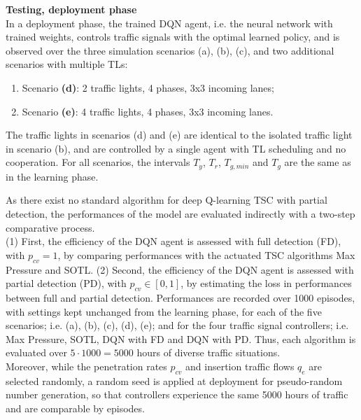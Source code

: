 \textbf{Testing, deployment phase} \\
In a deployment phase, the trained DQN agent, i.e. the neural network with trained weights, controls traffic signals with the optimal learned policy, and is observed over the three simulation scenarios (a), (b), (c), and two additional scenarios with multiple TLs:
\begin{enumerate}
\setlength\itemsep{-0.5em}
  \setcounter{enumi}{3}
  \item Scenario \textbf{(d)}: 2 traffic lights, 4 phases, 3x3 incoming lanes;
  \item Scenario \textbf{(e)}: 4 traffic lights, 4 phases, 3x3 incoming lanes.
\end{enumerate}
The traffic lights in scenarios (d) and (e) are identical to the isolated traffic light in scenario (b), and are controlled by a single agent with TL scheduling and no cooperation. For all scenarios, the intervals $T_y$, $T_r$, $T_{g,min}$ and $T_g$ are the same as in the learning phase.

\pagebreak

As there exist no standard algorithm for deep Q-learning TSC with partial detection, the performances of the model are evaluated indirectly with a two-step comparative process. \\
(1) First, the efficiency of the DQN agent is assessed with full detection (FD), with $p_{cv} = 1$, by comparing performances with the actuated TSC algorithms Max Pressure and SOTL.
(2) Second, the efficiency of the DQN agent is assessed with partial detection (PD), with $p_{cv} \in [0,1]$, by estimating the loss in performances between full and partial detection.
Performances are recorded over 1000 episodes, with settings kept unchanged from the learning phase, for each of the five scenarios; i.e. (a), (b), (c), (d), (e); and for the four traffic signal controllers; i.e. Max Pressure, SOTL, DQN with FD and DQN with PD. Thus, each algorithm is evaluated over $5 \cdot 1000 = 5000$ hours of diverse traffic situations. \\
Moreover, while the penetration rates $p_{cv}$ and insertion traffic flows $q_e$ are selected randomly, a random seed is applied at deployment for pseudo-random number generation, so that controllers experience the same 5000 hours of traffic and are comparable by episodes. \\

